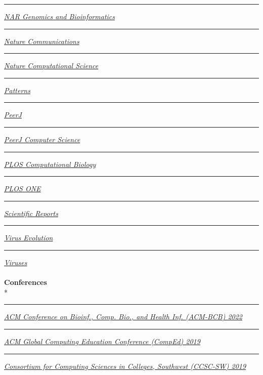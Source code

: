 \documentclass[margin,line]{res}
\begin{document}
\begin{resume}
\rule{-1mm}{5mm} \hspace*{4mm} \href{https://academic.oup.com/nargab}{\textit{NAR Genomics and Bioinformatics}}\\
\rule{-1mm}{5mm} \hspace*{4mm} \href{https://www.nature.com/ncomms}{\textit{Nature Communications}}\\
\rule{-1mm}{5mm} \hspace*{4mm} \href{https://www.nature.com/natcomputsci}{\textit{Nature Computational Science}}\\
\rule{-1mm}{5mm} \hspace*{4mm} \href{https://www.cell.com/patterns}{\textit{Patterns}}\\
\rule{-1mm}{5mm} \hspace*{4mm} \href{https://peerj.com/}{\textit{PeerJ}}\\
\rule{-1mm}{5mm} \hspace*{4mm} \href{https://peerj.com/computer-science/}{\textit{PeerJ Computer Science}}\\
\rule{-1mm}{5mm} \hspace*{4mm} \href{https://journals.plos.org/ploscompbiol/}{\textit{PLOS Computational Biology}}\\
\rule{-1mm}{5mm} \hspace*{4mm} \href{https://journals.plos.org/plosone/}{\textit{PLOS ONE}}\\
\rule{-1mm}{5mm} \hspace*{4mm} \href{https://www.nature.com/srep/}{\textit{Scientific Reports}}\\
\rule{-1mm}{5mm} \hspace*{4mm} \href{https://academic.oup.com/ve}{\textit{Virus Evolution}}\\
\rule{-1mm}{5mm} \hspace*{4mm} \href{https://www.mdpi.com/journal/viruses}{\textit{Viruses}}\\
~\\
\textbf{Conferences}\\*
\rule{-1mm}{5mm} \hspace*{4mm} \href{https://acm-bcb.org/2022}{\textit{ACM Conference on Bioinf., Comp. Bio., and Health Inf. (ACM-BCB) 2022}}\\
\rule{-1mm}{5mm} \hspace*{4mm} \href{http://www.acmcomped.org/}{\textit{ACM Global Computing Education Conference (CompEd) 2019}}\\
\rule{-1mm}{5mm} \hspace*{4mm} \href{http://www.ccsc.org/southwestern/2019/index.php}{\textit{Consortium for Computing Sciences in Colleges, Southwest (CCSC-SW) 2019}}\\

\end{resume}
\end{document}
